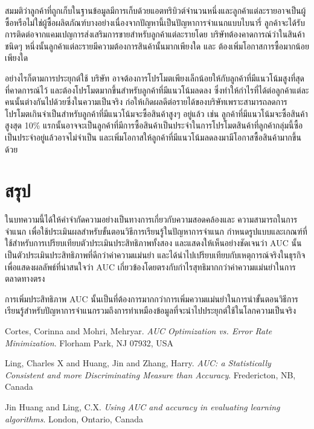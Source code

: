 \documentclass[twoside, twocolumn, 12pt]{article}
\begin{document}
สมมติว่าลูกค้าที่ถูกเก็บในฐานข้อมูลมีการเก็บด้วยแอตทริบิวต์จำนวนหนึ่งและลูกค้าแต่ละรายอาจเป็นผู้ซื้อหรือไม่ใช่ผู้ซื้อผลิตภัณฑ์บางอย่างเนื่องจากปัญหานี้เป็นปัญหาการจำแนกแบบไบนารี่ ลูกค้าจะได้รับการติดต่อจากแคมเปญการส่งเสริมการขายสำหรับลูกค้าแต่ละรายโดย บริษัทต้องคาดการณ์ว่าในสินค้าชนิดๆ หนึ่งนั้นลูกค้าแต่ละรายมีความต้องการสินค้านั้นมากเพียงใด และ ต้องเพิ่มโอกาสการซื้อมากน้อยเพียงใด

อย่างไรก็ตามการประยุกต์ใช้ บริษัท อาจต้องการโปรโมตเพียงเล็กน้อยให้กับลูกค้าที่มีแนวโน้มสูงที่สุดที่คาดการณ์ไว้ และต้องโปรโมตมากขึ้นสำหรับลูกค้าที่มีแนวโน้มลดลง ซึ่งทำให้กำไรที่ได้ต่อลูกค้าแต่ละคนนั้นต่างกันไปด้วยซึ่งในความเป็นจริง ก่อให้เกิดผลดีต่อรายได้ของบริษัทเพราะสามารถลดการโปรโมตเกินจำเป็นสำหรับลูกค้าที่มีแนวโน้มจะซื้อสินค้าสูงๆ อยู่แล้ว เช่น ลูกค้าที่มีแนวโน้มจะซื้อสินค้าสูงสุด 10\% แรกนั้นอาจจะเป็นลูกค้าที่มีการซื้อสินค้าเป็นประจำในการโปรโมตสินค้าที่ลูกค้ากลุ่มนี้ซื้อเป็นประจำอยู่แล้วอาจไม่จำเป็น และเพิ่มโอกาสให้ลูกค้าที่มีแนวโน้มลดลงมามีโอกาสซื้อสินค้ามากขึ้นด้วย 
\section{สรุป}
\quad ในบทความนี้ได้ให้คำจำกัดความอย่างเป็นทางการเกี่ยวกับความสอดคล้องและ ความสามารถในการจำแนก เพื่อใช้ประเมินผลสำหรับขั้นตอนวิธีการเรียนรู้ในปัญหาการจำแนก กำหนดรูปแบบและเกณฑ์ที่ใช้สำหรับการเปรียบเทียบตัวประเมินประสิทธิภาพทั้งสอง และแสดงให้เห็นอย่างชัดเจนว่า AUC นั้นเป็นตัวประเมินประสิทธิภาพที่ดีกว่าค่าความแม่นยำ และได้นำไปเปรียบเทียบกับเหตุการณ์จริงในธุรกิจเพื่อแสดงผลลัพธ์ที่น่าสนใจว่า AUC เกี่ยวข้องโดยตรงกับกำไรสุทธิมากกว่าค่าความแม่นยำในการตลาดทางตรง

การเพิ่มประสิทธิภาพ AUC นั้นเป็นที่ต้องการมากกว่าการเพิ่มความแม่นยำในการนำขั้นตอนวิธีการเรียนรู้สำหรับปัญหาการจำแนกรวมถึงการทำเหมืองข้อมูลที่จะนำไปประยุกต์ใช้ในโลกความเป็นจริง
\renewcommand\refname{ข้อมูลอ้างอิง}

\begin{thebibliography}{9}

Cortes, Corinna and Mohri, Mehryar. \textit{{AUC} {Optimization} vs. {Error} {Rate} {Minimization}}. Florham Park, NJ 07932, USA

Ling, Charles X and Huang, Jin and Zhang, Harry. \textit{{AUC}: a {Statistically} {Consistent} and more {Discriminating} {Measure} than {Accuracy}}. Fredericton, NB, Canada

{Jin Huang} and Ling, C.X. \textit{Using {AUC} and accuracy in evaluating learning algorithms}. London, Ontario, Canada


\end{thebibliography}
\end{document}

